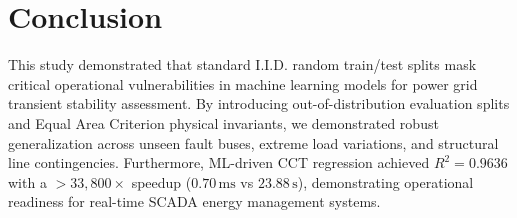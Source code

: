 \documentclass[journal]{IEEEtran}
\begin{document}
\section{Conclusion}
This study demonstrated that standard I.I.D. random train/test splits mask critical operational vulnerabilities in machine learning models for power grid transient stability assessment. By introducing out-of-distribution evaluation splits and Equal Area Criterion physical invariants, we demonstrated robust generalization across unseen fault buses, extreme load variations, and structural line contingencies. Furthermore, ML-driven CCT regression achieved $R^2 = 0.9636$ with a $>33,800\times$ speedup ($0.70\,\text{ms}$ vs $23.88\,\text{s}$), demonstrating operational readiness for real-time SCADA energy management systems.



\end{document}
